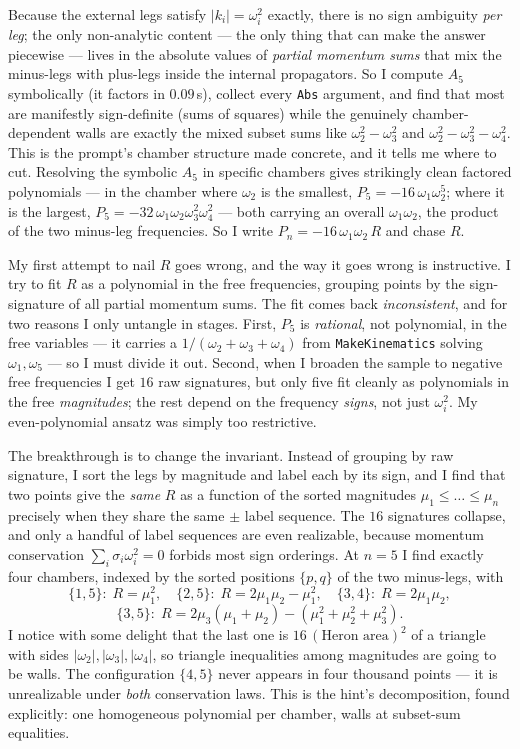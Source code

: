 \documentclass{article}
\begin{document}
Because the external legs satisfy $|k_i|=\omega_i^2$ exactly, there is no sign
ambiguity \emph{per leg}; the only non-analytic content --- the only thing that
can make the answer piecewise --- lives in the absolute values of \emph{partial
momentum sums} that mix the minus-legs with plus-legs inside the internal
propagators. So I compute $A_5$ symbolically (it factors in $0.09$\,s), collect
every \texttt{Abs} argument, and find that most are manifestly sign-definite
(sums of squares) while the genuinely chamber-dependent walls are exactly the
mixed subset sums like $\omega_2^2-\omega_3^2$ and
$\omega_2^2-\omega_3^2-\omega_4^2$. This is the prompt's chamber structure made
concrete, and it tells me where to cut. Resolving the symbolic $A_5$ in specific
chambers gives strikingly clean factored polynomials --- in the chamber where
$\omega_2$ is the smallest, $P_5=-16\,\omega_1\omega_2^5$; where it is the
largest, $P_5=-32\,\omega_1\omega_2\omega_3^2\omega_4^2$ --- both carrying an
overall $\omega_1\omega_2$, the product of the two minus-leg frequencies. So I
write $P_n=-16\,\omega_1\omega_2\,R$ and chase $R$.

My first attempt to nail $R$ goes wrong, and the way it goes wrong is
instructive. I try to fit $R$ as a polynomial in the free frequencies, grouping
points by the sign-signature of all partial momentum sums. The fit comes back
\emph{inconsistent}, and for two reasons I only untangle in stages. First, $P_5$
is \emph{rational}, not polynomial, in the free variables --- it carries a
$1/(\omega_2{+}\omega_3{+}\omega_4)$ from \texttt{MakeKinematics} solving
$\omega_1,\omega_5$ --- so I must divide it out. Second, when I broaden the
sample to negative free frequencies I get $16$ raw signatures, but only five fit
cleanly as polynomials in the free \emph{magnitudes}; the rest depend on the
frequency \emph{signs}, not just $\omega_i^2$. My even-polynomial ansatz was
simply too restrictive.

The breakthrough is to change the invariant. Instead of grouping by raw
signature, I sort the legs by magnitude and label each by its sign, and I find
that two points give the \emph{same} $R$ as a function of the sorted magnitudes
$\mu_1\le\dots\le\mu_n$ precisely when they share the same $\pm$ label sequence.
The $16$ signatures collapse, and only a handful of label sequences are even
realizable, because momentum conservation $\sum_i\sigma_i\omega_i^2=0$ forbids
most sign orderings. At $n=5$ I find exactly four chambers, indexed by the sorted
positions $\{p,q\}$ of the two minus-legs, with
\[
\{1,5\}:\;R=\mu_1^2,\quad
\{2,5\}:\;R=2\mu_1\mu_2-\mu_1^2,\quad
\{3,4\}:\;R=2\mu_1\mu_2,
\]
\[
\{3,5\}:\;R=2\mu_3(\mu_1+\mu_2)-(\mu_1^2+\mu_2^2+\mu_3^2).
\]
I notice with some delight that the last one is
$16\,(\text{Heron area})^2$ of a triangle with sides $|\omega_2|,|\omega_3|,
|\omega_4|$, so triangle inequalities among magnitudes are going to be walls. The
configuration $\{4,5\}$ never appears in four thousand points --- it is
unrealizable under \emph{both} conservation laws. This is the hint's
decomposition, found explicitly: one homogeneous polynomial per chamber, walls at
subset-sum equalities.
\end{document}
